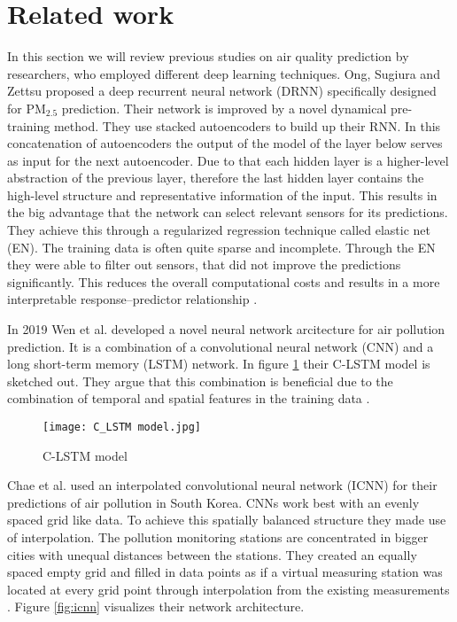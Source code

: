 \documentclass{article}
\begin{document}
\section{Related work}
In this section we will review previous studies on air quality prediction by researchers, who employed different deep learning techniques. 
Ong, Sugiura and Zettsu proposed a deep recurrent neural network (DRNN) specifically designed for PM$_{2.5}$ prediction. Their network is improved by a novel dynamical pre-training method. They use stacked autoencoders to build up their RNN. In this concatenation of autoencoders the output of the model of the layer below serves as input for the next autoencoder. Due to that each hidden layer is a higher-level abstraction of the previous layer, therefore the last hidden layer contains the high-level structure and representative information of the input.
This results in the big advantage that the network can select relevant sensors for its predictions. They achieve this through a regularized regression technique called elastic net (EN). The training data is often quite sparse and incomplete. Through the EN they were able to filter out sensors, that did not improve the predictions significantly. This reduces the overall computational costs and results in a more interpretable response–predictor relationship \citep{ong_dynamically_2016}.

In 2019 Wen et al. developed a novel neural network arcitecture for air pollution prediction. It is a combination of a convolutional neural network (CNN) and a long short-term memory (LSTM) network. In figure \ref{fig:c_lstm} their C-LSTM model is sketched out. They argue that this combination is beneficial due to the combination of temporal and spatial features in the training data \citep{wen_novel_2019}.

\begin{figure}[htb!]
\centering
\texttt{[image: C\_LSTM model.jpg]}
\caption{C-LSTM model \citep{wen_novel_2019}}
\label{fig:c_lstm}
\end{figure}
Chae et al. used an interpolated convolutional neural network (ICNN) for their predictions of air pollution in South Korea. CNNs work best with an evenly spaced grid like data. To achieve this spatially balanced structure they made use of interpolation. The pollution monitoring stations are concentrated in bigger cities with unequal distances between the stations. They created an equally spaced empty grid and filled in data points as if a virtual measuring station was located at every grid point through interpolation from the existing measurements \citep{chae_pm10_2021}. Figure \ref{fig:icnn} visualizes their network architecture.
\end{document}
